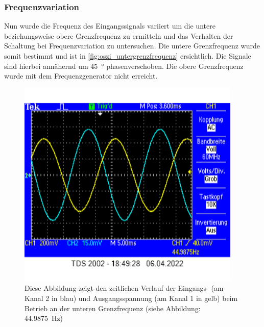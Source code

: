 \documentclass[12pt,english,ngerman]{scrartcl}
\begin{document}
\subsubsection{Frequenzvariation}

Nun wurde die Frequenz des Eingangssignals variiert um die untere beziehungsweise
obere Grenzfrequenz zu ermitteln und das Verhalten der Schaltung bei
Frequenzvariation zu untersuchen. Die untere Grenzfrequenz wurde somit bestimmt und ist in
\autoref{fig:oszi_untergrenzfrequenz} ersichtlich. Die Signale sind hierbei annähernd um \SI{45}{\degree} phasenverschoben.
Die obere Grenzfrequenz wurde mit dem Frequenzgenerator nicht erreicht.

\begin{figure}[H]
  \centering
    \includegraphics[width=\linewidth, height=10cm]{./figures/messungen/unteregrenze.png}
    \caption{Diese Abbildung zeigt den zeitlichen Verlauf der Eingangs- (am Kanal 2 in blau) und
    Ausgangsspannung (am Kanal 1 in gelb) beim Betrieb an der unteren Grenzfrequenz (siehe Abbildung:
  \SI{44.9875}{\hertz})}
  \label{fig:oszi_untergrenzfrequenz}
\end{figure}


\end{document}
